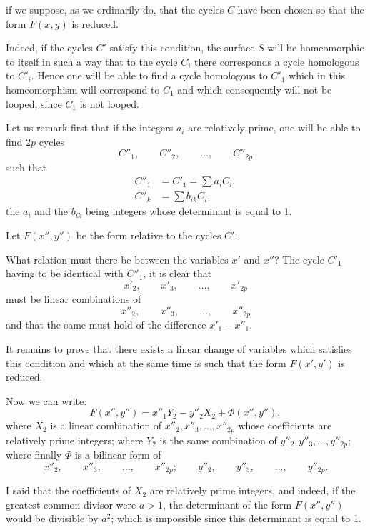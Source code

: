\documentclass{article}
\begin{document}
if we suppose, as we ordinarily do, that the cycles $C$ have been chosen so that the form $F(x, y)$ is reduced.

Indeed, if the cycles $C'$ satisfy this condition, the surface $S$ will be homeomorphic to itself in such a way that to the cycle $C_{i}$ there corresponds a cycle homologous to $C'_{i}$. Hence one will be able to find a cycle homologous to $C'_{1}$ which in this homeomorphism will correspond to $C_{1}$ and which consequently will not be looped, since $C_{1}$ is not looped.

Let us remark first that if the integers $a_{i}$ are relatively prime, one will be able to find $2p$ cycles
\[ C''_{1}, \qquad C''_{2}, \qquad \ldots, \qquad C''_{2p} \]
such that
\[ \begin{aligned} C''_{1} &= C'_{1} = \sum a_{i} C_{i}, \\ C''_{k} &= \sum b_{ik} C_{i}, \end{aligned} \]
the $a_{i}$ and the $b_{ik}$ being integers whose determinant is equal to 1.

Let $F(x'', y'')$ be the form relative to the cycles $C'$.

What relation must there be between the variables $x'$ and $x''$? The cycle $C'_{1}$ having to be identical with $C''_{1}$, it is clear that
\[ x'_{2}, \qquad x'_{3}, \qquad \ldots, \qquad x'_{2p} \]
must be linear combinations of
\[ x''_{2}, \qquad x''_{3}, \qquad \ldots, \qquad x''_{2p} \]
and that the same must hold of the difference $x'_{1} - x''_{1}$.

It remains to prove that there exists a linear change of variables which satisfies this condition and which at the same time is such that the form $F(x', y')$ is reduced.

Now we can write:
\[ F(x'', y'') = x''_{1} Y_{2} - y''_{2} X_{2} + \Phi(x'', y''), \]
where $X_{2}$ is a linear combination of $x''_{2}, x''_{3}, \ldots, x''_{2p}$ whose coefficients are relatively prime integers; where $Y_{2}$ is the same combination of $y''_{2}, y''_{3}, \ldots, y''_{2p}$; where finally $\Phi$ is a bilinear form of
\[ x''_{2}, \qquad x''_{3}, \qquad \ldots, \qquad x''_{2p}; \qquad y''_{2}, \qquad y''_{3}, \qquad \ldots, \qquad y''_{2p}. \]

I said that the coefficients of $X_{2}$ are relatively prime integers, and indeed, if the greatest common divisor were $a > 1$, the determinant of the form $F(x'', y'')$ would be divisible by $a^{2}$; which is impossible since this determinant is equal to 1.
\end{document}

